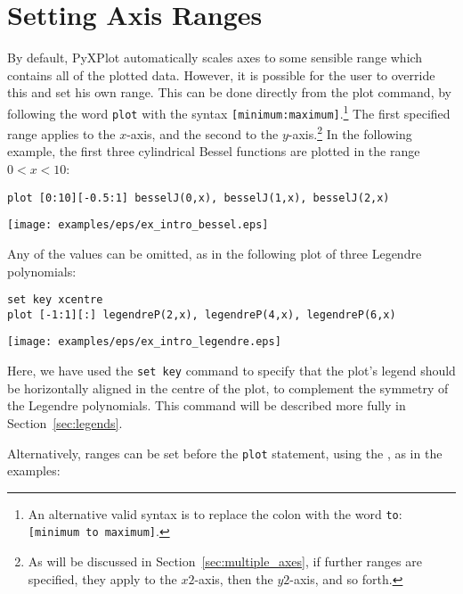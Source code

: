 
\section{Setting Axis Ranges}
\label{sec:plot_ranges}

By default, PyXPlot automatically scales axes to some sensible range which
contains all of the plotted data. However, it is possible for the user to
override this and set his own range. This can be
done directly from the plot command, by following the word {\tt plot} with the
syntax {\tt [minimum:maximum]}.\footnote{An alternative valid syntax is to
replace the colon with the word {\tt to}: {\tt [minimum to maximum]}.} The
first specified range applies to the $x$-axis, and the second to the
$y$-axis.\footnote{As will be discussed in Section~\ref{sec:multiple_axes}, if
further ranges are specified, they apply to the $x2$-axis, then the $y2$-axis,
and so forth.} In the following example, the first three cylindrical Bessel
functions are plotted in the range $0<x<10$:

\begin{verbatim}
plot [0:10][-0.5:1] besselJ(0,x), besselJ(1,x), besselJ(2,x)
\end{verbatim}
\begin{center}
\texttt{[image: examples/eps/ex\_intro\_bessel.eps]}
\end{center}

\noindent Any of the values can be omitted, as in the following plot of
three Legendre polynomials:

\begin{verbatim}
set key xcentre
plot [-1:1][:] legendreP(2,x), legendreP(4,x), legendreP(6,x)
\end{verbatim}
\begin{center}
\texttt{[image: examples/eps/ex\_intro\_legendre.eps]}
\end{center}

\noindent Here, we have used the {\tt set key} command to specify that the
plot's legend should be horizontally aligned in the centre of the plot, to
complement the symmetry of the Legendre polynomials. This command will be
described more fully in Section~\ref{sec:legends}.

Alternatively, ranges can be set before the {\tt plot} statement, using the
, as in the examples:

